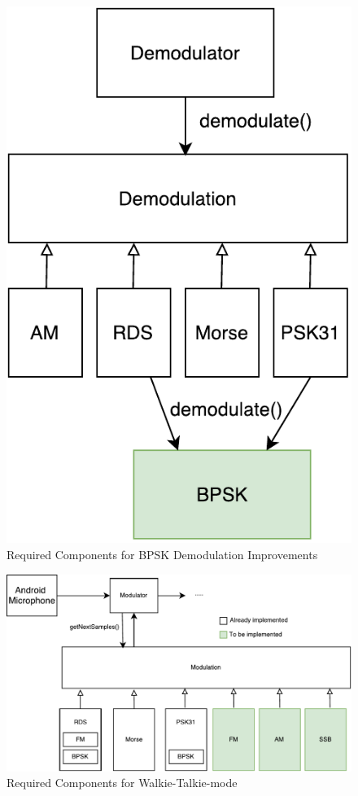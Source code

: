 \begin{figure}
	\centering
	\includegraphics[width=0.5\linewidth]{gfx/feature3_components.pdf}
	\caption{Required Components for BPSK Demodulation Improvements}
	\label{fig:bpsk_components}
\end{figure}


\begin{figure}
	\centering
	\includegraphics[width=1\linewidth]{gfx/feature4_components.pdf}
	\caption{Required Components for Walkie-Talkie-mode}
	\label{fig:walkie_talkie_components}
\end{figure}